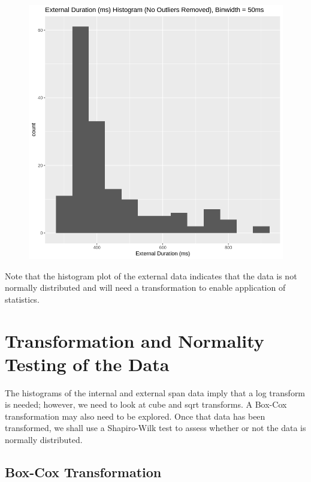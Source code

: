 \documentclass[
  letterpaper,
  DIV=11,
  numbers=noendperiod]{scrartcl}
\begin{document}
\begin{figure}[H]

{\centering \includegraphics{dss-span-analysis-rev5_files/figure-pdf/cell-62-output-1.png}

}

\end{figure}

Note that the histogram plot of the external data indicates that the
data is not normally distributed and will need a transformation to
enable application of statistics.

\hypertarget{transformation-and-normality-testing-of-the-data}{%
\section{Transformation and Normality Testing of the
Data}\label{transformation-and-normality-testing-of-the-data}}

The histograms of the internal and external span data imply that a log
transform is needed; however, we need to look at cube and sqrt
transforms. A Box-Cox transformation may also need to be explored. Once
that data has been transformed, we shall use a Shapiro-Wilk test to
assess whether or not the data is normally distributed.

\hypertarget{box-cox-transformation}{%
\subsection{Box-Cox Transformation}\label{box-cox-transformation}}
\end{document}
